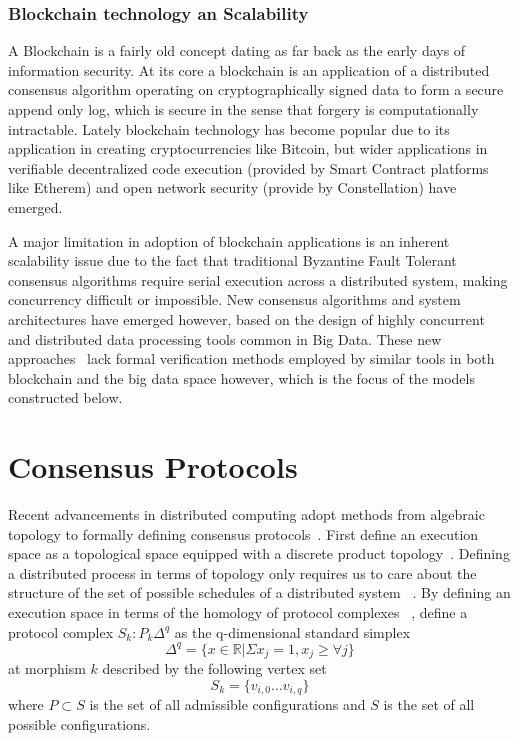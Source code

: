 \documentclass[runningheads]{llncs}
\begin{document}
\subsubsection{Blockchain technology an Scalability}
A Blockchain is a fairly old concept dating as far back as the early days of information security. At its core a blockchain is an application of a distributed consensus algorithm operating on cryptographically signed data to form a secure append only log, which is secure in the sense that forgery is computationally intractable. Lately blockchain technology has become popular due to its application in creating cryptocurrencies like Bitcoin, but wider applications in verifiable decentralized code execution (provided by Smart Contract platforms like Etherem) and open network security (provide by Constellation) have emerged. 

A major limitation in adoption of blockchain applications is an inherent scalability issue due to the fact that traditional Byzantine Fault Tolerant consensus algorithms require serial execution across a distributed system, making concurrency difficult or impossible. New consensus algorithms and system architectures have emerged however, based on the design of highly concurrent and distributed data processing tools common in Big Data. These new approaches~\cite{ref_url3,ref_url6} lack formal verification methods employed by similar tools in both blockchain and the big data space however, which is the focus of the models constructed below.

\section{Consensus Protocols}
Recent advancements in distributed computing adopt methods from algebraic topology to formally defining consensus protocols~\cite{ref_article1,ref_article2}. First define an execution space as a topological space equipped with a discrete product topology~\cite{ref_article3}. Defining a distributed process in terms of topology only requires us to care about the structure of the set of possible schedules of a distributed system ~\cite{ref_article4}. By defining an execution space in terms of the homology of protocol complexes ~\cite{ref_article2}, define a protocol complex $S_k: P_k{\Delta^q}$ as the q-dimensional standard simplex
\begin{equation}
\Delta^q = \{x \in \mathbb{R} | \Sigma x_j = 1, x_j \geq \forall j \}
\end{equation} 
at morphism $k$ described by the following vertex set
\begin{equation}
S_k = \{v_{i,0} \dots v_{i,q}\}
\end{equation}
where $P \subset S$ is the set of all admissible configurations and $S$ is the set of all possible configurations.
\end{document}
